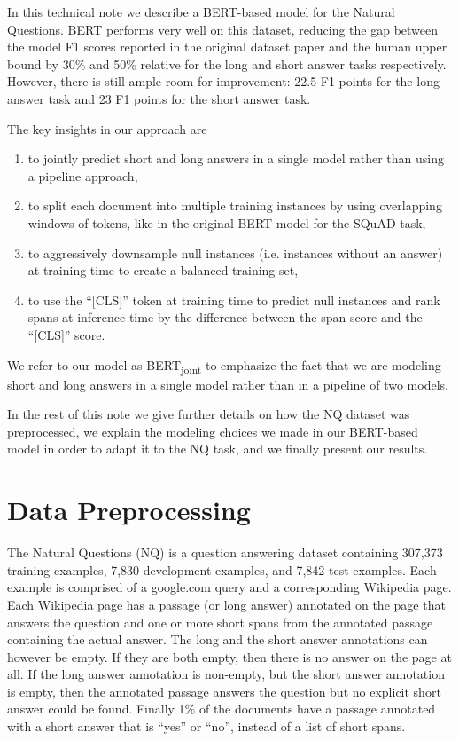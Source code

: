 \documentclass[11pt,a4paper]{article}
\begin{document}
In this technical note we describe a BERT-based model for the Natural Questions. BERT performs very well on this dataset, reducing the gap between the model F1 scores reported in the original dataset paper and the human upper bound by 30\% and 50\% relative for the long and short answer tasks respectively. However, there is still ample room for improvement: 22.5 F1 points for the long answer task and 23 F1 points for the short answer task. 

The key insights in our approach are
\begin{enumerate}
    \item to jointly predict short and long answers in a single model rather than using a pipeline approach,
    \item to split each document into multiple training instances by using overlapping windows of tokens, like in the original BERT model for the SQuAD task,
    \item to aggressively downsample null instances (i.e. instances without an answer) at training time to create a balanced training set,
    \item to use the ``[CLS]'' token at training time to predict null instances and rank spans at inference time by the difference between the span score and the ``[CLS]'' score.
\end{enumerate}
We refer to our model as BERT\textsubscript{joint} to emphasize the fact that we are modeling short and long answers in a single model rather than in a pipeline of two models.

In the rest of this note we give further details on how the NQ dataset was preprocessed, we explain the modeling choices we made in our BERT-based model in order to adapt it to the NQ task, and we finally present our results.

\section{Data Preprocessing}
 
The Natural Questions (NQ) \cite{kwiatkowski2019nq} is a question answering dataset containing 307,373 training examples, 7,830 development examples, and 7,842 test examples. Each example is comprised of a google.com query and a corresponding Wikipedia page. Each Wikipedia page has a passage (or long answer) annotated on the page that answers the question and one or more short spans from the annotated passage containing the actual answer. The long and the short answer annotations can however be empty. If they are both empty, then there is no answer on the page at all. If the long answer annotation is non-empty, but the short answer annotation is empty, then the annotated passage answers the question but no explicit short answer could be found. Finally 1\% of the documents have a passage annotated with a short answer that is ``yes'' or ``no'', instead of a list of short spans.
\end{document}
